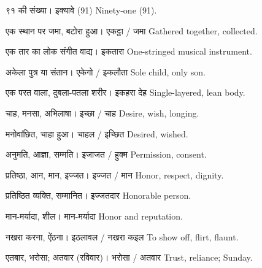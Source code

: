 %
{९१ की संख्या।}%
{इक्यावे (91)}%
{Ninety-one (91).}

%
{एक स्थान पर जमा, बटोरा हुआ।}%
{एकट्ठा / जमा}%
{Gathered together, collected.}

%
{एक तार का लोक संगीत वाद्य।}%
{इकतारा}%
{One-stringed musical instrument.}

%
{अकेला पुत्र या संतान।}%
{एकेगो / इकलौता}%
{Sole child, only son.}

%
{एक परत वाला, दुबला-पतला शरीर।}%
{इकहरा देह}%
{Single-layered, lean body.}

%
{चाह, मनसा, अभिलाषा।}%
{इच्छा / चाह}%
{Desire, wish, longing.}

%
{मनोवांछित, चाहा हुआ।}%
{चाहल / इच्छित}%
{Desired, wished.}

%
{अनुमति, आज्ञा, सम्मति।}%
{इजाजत / हुक्म}%
{Permission, consent.}

%
{प्रतिष्ठा, आन, मान, इज्जत।}%
{इज्जत / मान}%
{Honor, respect, dignity.}

%
{प्रतिष्ठित व्यक्ति, सम्मानित।}%
{इज्जतदार}%
{Honorable person.}

%
{मान-मर्यादा, शील।}%
{मान-मर्यादा}%
{Honor and reputation.}

%
{नखरा करना, ऐंठना।}%
{इठलावल / नखरा कइल}%
{To show off, flirt, flaunt.}

%
{एतबार, भरोसा; अतवार (रविवार)।}%
{भरोसा / अतवार}%
{Trust, reliance; Sunday.}

